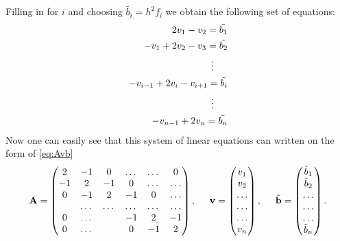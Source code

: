 \documentclass[11pt,a4paper,english,draft]{article}
\numberwithin{equation}{section}
\newcommand{\ve}[1]{\mathbf{#1}} %
\newcommand{\spac}{\hspace{5mm}}
\begin{document}
Filling in for $i$ and choosing $\tilde{b_i} = h^2 f_i$ we obtain the following set of equations: 
\begin{align*}
	2v_{1}-v_{2}=\tilde{b_1} \\
	-v_{1}+2v_{2}-v_{3}=\tilde{b_2} \\
	\vdots \hspace{0.5cm} \\
	-v_{i-1}+2v_{i}-v_{i+1}=\tilde{b_i} \\
	\vdots \hspace{0.5cm}  \\ 
	-v_{n-1}+2v_{n}=\tilde{b_n} \\
\end{align*}
Now one can easily see that this system of linear equations can written on the form of \eqref{eq:Avb}
\begin{gather*}
    \ve{A} = \begin{pmatrix}
                           2& -1& 0 &\dots   & \dots &0 \\
                           -1 & 2 & -1 &0 &\dots &\dots \\
                           0&-1 &2 & -1 & 0 & \dots \\
                           & \dots   & \dots &\dots   &\dots & \dots \\
                           0&\dots   &  &-1 &2& -1 \\
                           0&\dots    &  & 0  &-1 & 2 \\
                      \end{pmatrix},\spac \ve{v} = \begin{pmatrix}
                           v_1\\
                           v_2\\
                           \dots \\
                          \dots  \\
                          \dots \\
                           v_n\\
                      \end{pmatrix},
  \spac \tilde{\ve{b}} = \begin{pmatrix}
                           \tilde{b}_1\\
                           \tilde{b}_2\\
                           \dots \\
                           \dots \\
                          \dots \\
                           \tilde{b}_n\\
                      \end{pmatrix}.
\end{gather*}
\end{document}
